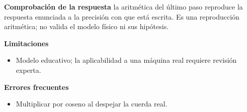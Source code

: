 \documentclass[10pt,openany]{book}
\begin{document}
\begin{tcolorbox}[title={Problema resuelto 2}, studiumworked, breakable]
\noindent\textbf{Comprobación de la respuesta} la aritmética del último paso reproduce la respuesta enunciada a la precisión con que está escrita. Es una reproducción aritmética; no valida el modelo físico ni sus hipótesis.

\noindent\textbf{Limitaciones}
\begin{itemize}
\item Modelo educativo; la aplicabilidad a una máquina real requiere revisión experta.
\end{itemize}

\noindent\textbf{Errores frecuentes}
\begin{itemize}
\item Multiplicar por coseno al despejar la cuerda real.
\end{itemize}
\end{tcolorbox}
\end{document}
